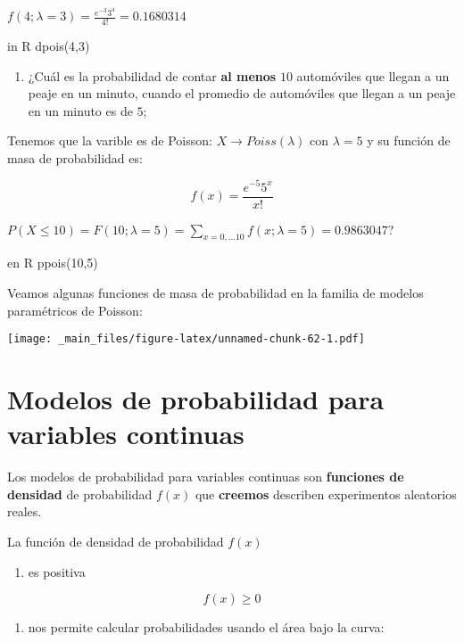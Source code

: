 \documentclass[
]{book}
\providecommand{\tightlist}{%
  \setlength{\itemsep}{0pt}\setlength{\parskip}{0pt}}
\begin{document}
\(f(4; \lambda=3)= \frac{e^{-3}3^4}{4!}=0.1680314\)

in R dpois(4,3)

\begin{enumerate}
\def\labelenumi{\arabic{enumi})}
\setcounter{enumi}{2}
\tightlist
\item
  ¿Cuál es la probabilidad de contar \textbf{al menos} \(10\) automóviles que llegan a un peaje en un minuto, cuando el promedio de automóviles que llegan a un peaje en un minuto es de \(5\);
\end{enumerate}

Tenemos que la varible es de Poisson: \(X \rightarrow Poiss(\lambda)\) con \(\lambda=5\) y su función de masa de probabilidad es:

\[f(x)= \frac{e^{-5}5^x}{x!}\]

\(P(X \leq 10)=F(10; \lambda=5)=\sum_{x=0, ...10}f(x; \lambda=5)=0.9863047\)?

en R ppois(10,5)

Veamos algunas funciones de masa de probabilidad en la familia de modelos paramétricos de Poisson:

\texttt{[image: \_main\_files/figure-latex/unnamed-chunk-62-1.pdf]}

\hypertarget{modelos-de-probabilidad-para-variables-continuas}{%
\section{Modelos de probabilidad para variables continuas}\label{modelos-de-probabilidad-para-variables-continuas}}

Los modelos de probabilidad para variables continuas son \textbf{funciones de densidad} de probabilidad \(f(x)\) que \textbf{creemos} describen experimentos aleatorios reales.

La función de densidad de probabilidad \(f(x)\)

\begin{enumerate}
\def\labelenumi{\arabic{enumi})}
\tightlist
\item
  es positiva
\end{enumerate}

\[f(x) \geq 0\]

\begin{enumerate}
\def\labelenumi{\arabic{enumi})}
\setcounter{enumi}{1}
\tightlist
\item
  nos permite calcular probabilidades usando el área bajo la curva:
\end{enumerate}
\end{document}
